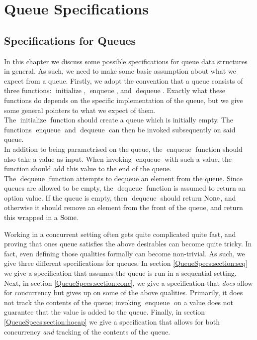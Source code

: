 \documentclass[a4paper, 10pt]{report}
\theoremstyle{definition}
\newcommand{\initialise}{\operatorname{initialize}}
\newcommand{\enqueue}{\operatorname{enqueue}}
\newcommand{\dequeue}{\operatorname{dequeue}}
\begin{document}

\chapter{Queue Specifications}
\label{ch:QueueSpecs}

\section{Specifications for Queues}
\label{QueueSpecs:section:specs}

In this chapter we discuss some possible specifications for queue data structures in general. As such, we need to make some basic assumption about what we expect from a queue. Firstly, we adopt the convention that a queue consists of three functions: $\initialise$, $\enqueue$, and $\dequeue$. Exactly what these functions do depends on the specific implementation of the queue, but we give some general pointers to what we expect of them.\\
The $\initialise$ function should create a queue which is initially empty. The functions $\enqueue$ and $\dequeue$ can then be invoked subsequently on said queue.\\
In addition to being parametrised on the queue, the $\enqueue$ function should also take a value as input. When invoking $\enqueue$ with such a value, the function should add this value to the end of the queue.\\
The $\dequeue$ function attempts to dequeue an element from the queue. Since queues are allowed to be empty, the $\dequeue$ function is assumed to return an option value. If the queue is empty, then $\dequeue$ should return $\operatorname{None}$, and otherwise it should remove an element from the front of the queue, and return this wrapped in a $\operatorname{Some}$.

Working in a concurrent setting often gets quite complicated quite fast, and proving that ones queue satisfies the above desirables can become quite tricky. In fact, even defining those qualities formally can become non-trivial. As such, we give three different specifications for queues. In section \ref{QueueSpecs:section:seq} we give a specification that assumes the queue is run in a sequential setting. Next, in section \ref{QueueSpecs:section:conc}, we give a specification that \textit{does} allow for concurrency but gives up on some of the above qualities. Primarily, it does not track the contents of the queue; invoking $\enqueue$ on a value does not guarantee that the value is added to the queue. Finally, in section \ref{QueueSpecs:section:hocap} we give a specification that allows for both concurrency \textit{and} tracking of the contents of the queue.
\end{document}
